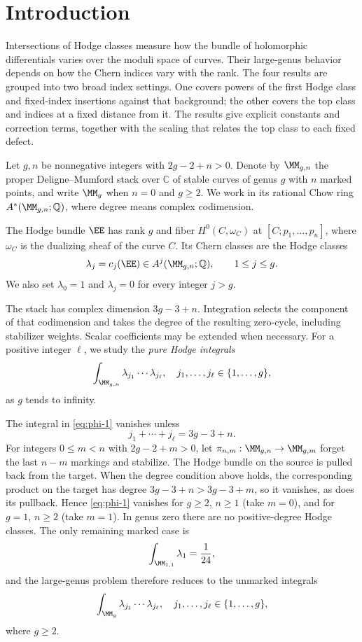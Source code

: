 \section{Introduction}
\label{sec:introduction}

Intersections of Hodge classes measure how the bundle of holomorphic
differentials varies over the moduli space of curves. Their
large-genus behavior depends on how the Chern indices vary with
the rank. The four results are grouped into two broad index
settings. One covers powers of the first Hodge class and fixed-index
insertions against that background; the other covers the top class
and indices at a fixed distance from it. The results give explicit
constants and
correction terms, together with the scaling that relates the top
class to each fixed defect.

Let $g,n$ be nonnegative integers with $2g-2+n>0$.  Denote by
$\MM_{g,n}$ the proper Deligne--Mumford stack over $\mathbb C$ of
stable curves of genus $g$ with $n$ marked points, and write $\MM_g$
when $n=0$ and $g\geq2$.  We work in its rational Chow ring
$A^*(\MM_{g,n};\mathbb Q)$, where degree means complex codimension.

The Hodge bundle $\EE$ has rank $g$ and fiber $H^0(C,\omega_C)$ at
$[C;p_1,\ldots,p_n]$, where $\omega_C$ is the dualizing sheaf of the
curve $C$.  Its Chern classes are the Hodge classes
\[\lambda_j=c_j(\EE)\in A^j(\MM_{g,n};\mathbb Q),
\qquad 1\leq j\leq g.\]
We also set $\lambda_0=1$ and $\lambda_j=0$ for every integer $j>g$.

The stack has complex dimension $3g-3+n$.  Integration selects the
component of that codimension and takes the degree of the resulting
zero-cycle, including stabilizer weights.  Scalar
coefficients may be extended when necessary.  For a positive integer
$\ell$, we study the \emph{pure Hodge integrals}
\begin{equation}
\int_{\MM_{g,n}}\lambda_{j_1}\cdots \lambda_{j_\ell},\quad j_1, \dots, j_\ell \in \{1, \dots, g\},
\label{eq:phi-1}
\end{equation}
as $g$ tends to infinity.

The integral in \eqref{eq:phi-1} vanishes unless
\[j_1+\cdots+j_\ell=3g-3+n.\]
For integers $0\leq m<n$ with $2g-2+m>0$, let
$\pi_{n,m}:\MM_{g,n}\to\MM_{g,m}$ forget the last $n-m$ markings
and stabilize.  The Hodge bundle on the source is pulled back from the
target.  When the degree condition above holds, the corresponding
product on the target has degree $3g-3+n>3g-3+m$, so it vanishes,
as does its pullback.  Hence \eqref{eq:phi-1} vanishes for $g\geq2$,
$n\geq1$ (take $m=0$), and for $g=1$, $n\geq2$ (take $m=1$).
In genus zero there are no positive-degree Hodge classes.  The only
remaining marked case is
\[\int_{\MM_{1,1}}\lambda_1=\frac{1}{24},\]
and the large-genus problem therefore reduces to the unmarked integrals
\begin{equation}
\int_{\MM_g}\lambda_{j_1}\cdots \lambda_{j_\ell},
\quad j_1, \dots, j_\ell \in \{1, \dots, g\},
\label{eq:phi-2}
\end{equation}
where $g\ge 2$.

